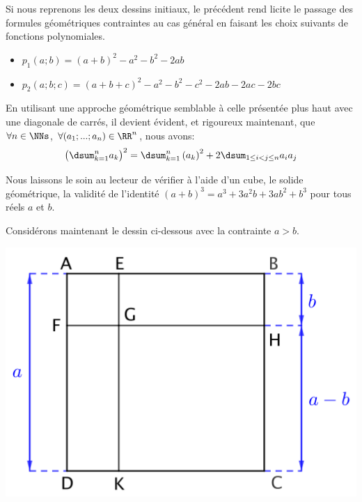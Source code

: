 

\begin{example}
    Si nous reprenons les deux dessins initiaux, le  précédent rend licite le passage des formules géométriques contraintes au cas général en faisant les choix suivants de fonctions polynomiales.
    \begin{itemize}[label=\small\textbullet]
    	\item $p_1(a ; b) = (a + b)^2 - a^2 - b^2 - 2 ab$
    
    	\item $p_2(a ; b ; c) = (a + b + c)^2 - a^2 - b^2 - c^2 - 2 ab - 2 ac - 2 bc$
    \end{itemize}
\end{example}


\begin{example}
	En utilisant une approche géométrique semblable à celle présentée plus haut avec une diagonale de carrés, il devient évident, et rigoureux maintenant, que $\forall n \in \NNs$, $\forall (a_1 ; ... ; a_n) \in \RR^n$, nous avons:
    \[
    	\big( \dsum_{k=1}^{n}a_k \big)^2
    	=
    	\dsum_{k=1}^{n} \left( a_k \right)^2
    	+
    	2 \dsum_{1 \leq i < j \leq n} a_i a_j
    \]
\end{example}




\begin{example}
	Nous laissons le soin au lecteur de vérifier à l'aide d'un cube, le solide géométrique, la validité de l'identité $(a + b)^3 = a^3 + 3 a^2 b + 3 a b^2 + b^3$ pour tous réels $a$ et $b$.
\end{example}




\newpage
Considérons maintenant le dessin ci-dessous avec la contrainte $a > b$.
%
\begin{center}
	\includegraphics[scale = .7]{(a-b)^2.png}
\end{center}

